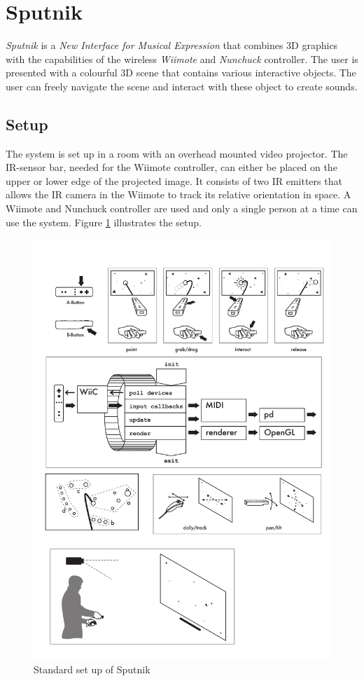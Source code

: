 \documentclass[10pt,a4paper]{scrartcl}
\begin{document}









\section{Sputnik}
\emph{Sputnik} is a \emph{New Interface for Musical Expression} that combines 3D graphics with the capabilities of the wireless \emph{Wiimote} and \emph{Nunchuck} controller. The user is presented with a colourful 3D scene that contains various interactive objects. The user can freely navigate the scene and interact with these object to create sounds.

\subsection{Setup}
The system is set up in a room with an overhead mounted video projector. The IR-sensor bar, needed for the Wiimote controller, can either be placed on the upper or lower edge of the projected image. It consists of two IR emitters that allows the IR camera in the Wiimote to track its relative orientation in space. A Wiimote and Nunchuck controller are used and only a single person at a time can use the system. Figure \ref{fig:sputnik-setup} illustrates the setup.

\begin{figure}[hbtp]
\begin{center}
\includegraphics[width=0.4\columnwidth]{img/setup}
\caption{Standard set up of Sputnik}
\label{fig:sputnik-setup}
\end{center}
\end{figure}
\end{document}
